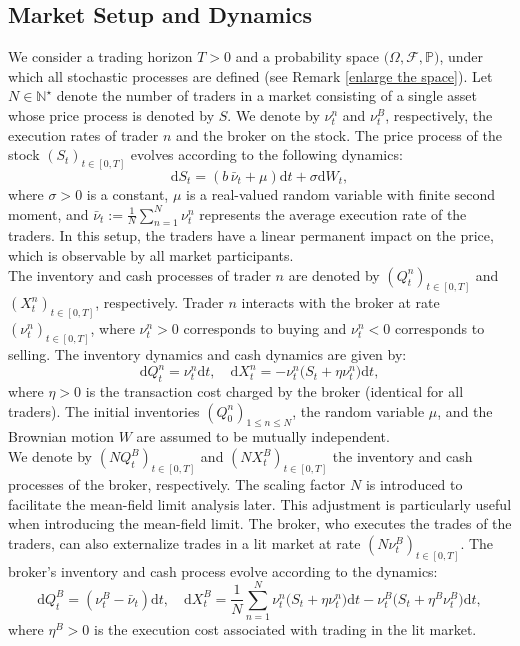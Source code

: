\documentclass[10pt]{article}
\def\d{\mathrm{d}}
\begin{document}
\subsection{Market Setup and Dynamics}\label{subsec_Model}

We consider a trading horizon \( T > 0 \) and a probability space \( \big(\Omega, \mathcal{F}, \mathbb{P}\big) \), under which all stochastic processes are defined (see Remark \ref{enlarge the space}). Let \( N \in \mathbb{N}^\star \) denote the number of traders in a market consisting of a single asset whose price process is denoted by \( S \). We denote by \( \nu_t^n \) and \( \nu_t^B \), respectively, the execution rates of trader \( n \) and the broker on the stock. The price process of the stock \( (S_t)_{t \in [0,T]} \) evolves according to the following dynamics:
\[
\d S_t = \left(b\,\bar{\nu}_t + \mu \right) \d t + \sigma \d W_t,
\]
where \( \sigma > 0 \) is a constant, \( \mu \) is a real-valued random variable with finite second moment, and \( \bar{\nu}_t := {\scriptstyle \frac{1}{N} \sum\nolimits_{n=1}^N }\nu_t^n \) represents the average execution rate of the traders. In this setup, the traders have a linear permanent impact on the price, which is observable by all market participants.\\

The inventory and cash processes of trader \( n \) are denoted by \( (Q^n_t)_{t \in [0,T]} \) and \( (X^n_t)_{t \in [0,T]} \), respectively. Trader \( n \) interacts with the broker at rate \( (\nu_t^n)_{t \in [0,T]} \), where \( \nu^n_t > 0 \) corresponds to buying and \( \nu^n_t < 0 \) corresponds to selling. The inventory dynamics and cash dynamics are given by:
\[
\d Q^n_t = \nu^n_t \d t,\quad
\d X^n_t = -\nu^n_t \big(S_t + \eta \nu^n_t \big) \d t,
\]
where \( \eta > 0 \) is the transaction cost charged by the broker (identical for all traders). The initial inventories \( (Q_0^n)_{1 \leq n \leq N} \), the random variable \( \mu \), and the Brownian motion \( W \) are assumed to be mutually independent.\\

We denote by \( (N Q^B_t)_{t \in [0,T]} \) and \( (N X^B_t)_{t \in [0,T]} \) the inventory and cash processes of the broker, respectively. The scaling factor $N$ is introduced to facilitate the mean-field limit analysis later. This adjustment is particularly useful when introducing the mean-field limit. The broker, who executes the trades of the traders, can also externalize trades in a lit market at rate \( (N \nu^B_t)_{t \in [0,T]} \). The broker's inventory and cash process evolve according to the dynamics:
\[
\d Q^B_t = \left(\nu^B_t - \bar \nu_t \right) \d t, \quad
\d X^B_t = \frac{1}{N} \sum_{n=1}^N \nu^n_t \big(S_t + \eta \nu^n_t \big) \d t - \nu^B_t \big(S_t + \eta^B \nu^B_t \big) \d t,
\]
where \( \eta^B > 0 \) is the execution cost associated with trading in the lit market.
\end{document}
